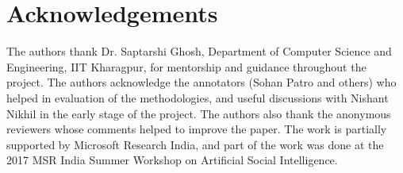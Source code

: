 \documentclass[sigconf]{acmart}
\begin{document}



\section*{Acknowledgements} 
The authors thank Dr. Saptarshi Ghosh, Department of Computer Science and Engineering, IIT Kharagpur, for mentorship and guidance throughout the project. 
The authors acknowledge the annotators (Sohan Patro and others) who helped in evaluation of the methodologies, and useful discussions with Nishant Nikhil in the early stage of the project. 
The authors also thank the anonymous reviewers whose comments helped to improve the paper.
The work is partially supported by Microsoft Research India, and part of the work was done at the 2017 MSR India Summer Workshop on Artificial Social Intelligence.



 
\end{document}
